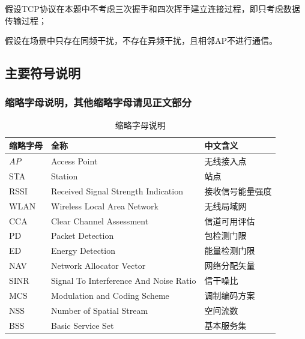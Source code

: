 \documentclass[bwprint]{gmcmthesis}
\begin{document}
\begin{assumption}
	\label{asm:3}
	假设TCP协议在本题中不考虑三次握手和四次挥手建立连接过程，即只考虑数据传输过程；
\end{assumption}

\begin{assumption}
	\label{asm:4}
	假设在场景中只存在同频干扰，不存在异频干扰，且相邻AP不进行通信。
\end{assumption}

\subsection{主要符号说明}
\subsubsection{缩略字母说明，其他缩略字母请见正文部分}

\begin{table}[H]
	\centering
	\caption{缩略字母说明}
	\begin{tabular}{p{2.0cm}<{\centering}p{8.0cm}<{\centering}p{4.0cm}<{\centering}}
		\hline
		缩略字母 & 全称 & 中文含义  \\ %
		\hline
		$AP$ & Access Point & 无线接入点   \\ %
		STA	& Station	& 站点\\
		
		RSSI &	Received Signal Strength Indication	& 接收信号能量强度\\
		
		WLAN &	Wireless Local Area Network	& 无线局域网\\
		
		CCA &	Clear Channel Assessment	& 信道可用评估\\
		
		PD &	Packet Detection	& 包检测门限\\
		
		ED &	Energy Detection	& 能量检测门限\\
		
		NAV	 & Network Allocator Vector	& 网络分配矢量\\
		
		SINR &	Signal To Interference And Noise Ratio	& 信干噪比\\
		
		MCS &	Modulation and Coding Scheme	& 调制编码方案\\
		
		NSS &	Number of Spatial Stream	& 空间流数\\
		
		BSS &	Basic Service Set	& 基本服务集\\
		
		\hline
	\end{tabular}
\end{table}
\end{document}
